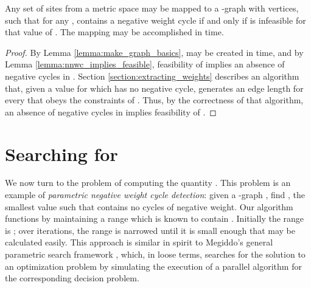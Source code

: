 \documentclass{llncs}
\begin{document}

\begin{theorem}
\label{theorem:create_graph}
Any set  of  sites from a metric space may be mapped to a -graph  with  vertices, such that for any ,  contains a negative weight cycle if and only if  is infeasible for that value of .  The mapping may be accomplished in  time.
\end{theorem}

\begin{proof}
By Lemma \ref{lemma:make_graph_basics},  may be created in  time, and by Lemma \ref{lemma:nnwc_implies_feasible}, feasibility of  implies an absence of negative cycles in .  Section \ref{section:extracting_weights} describes an algorithm that, given a value  for which  has no negative cycle, generates an edge length  for every  that obeys the constraints of .  Thus, by the correctness of that algorithm, an absence of negative cycles in  implies feasibility of .
\end{proof}

\section{Searching for }
\label{section:cycle_detection}

We now turn to the problem of computing the quantity .  This problem is an example of \emph{parametric negative weight cycle detection}: given a -graph , find , the smallest value such that  contains no cycles of negative weight.  Our algorithm functions by maintaining a range  which is known to contain .  Initially the range is ; over  iterations, the range is narrowed until it is small enough that  may be calculated easily.  This approach is similar in spirit to Megiddo's general parametric search framework \cite{804326,322410}, which, in loose terms, searches for the solution to an optimization problem by simulating the execution of a parallel algorithm for the corresponding decision problem.
\end{document}

